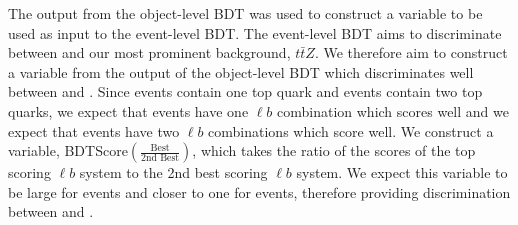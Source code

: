 The output from the object-level BDT was used to construct a variable to be used as input to the event-level BDT. The event-level BDT aims to discriminate between \tWZ and our most prominent background, $t\bar{t}Z$. We therefore aim to construct a variable from the output of the object-level BDT which discriminates well between \tWZ and \ttZ. Since \tWZ events contain one top quark and \ttZ events contain two top quarks, we expect that \tWZ events have one $\ell b$ combination which scores well and we expect that \ttZ events have two $\ell b$ combinations which score well. We construct a variable, BDTScore$(\frac{\text{Best}}{\text{2nd Best}})$, which takes the ratio of the scores of the top scoring $\ell b$ system to the 2nd best scoring $\ell b$ system. We expect this variable to be large for \tWZ events and closer to one for \ttZ events, therefore providing discrimination between \tWZ and \ttZ.\\\\

